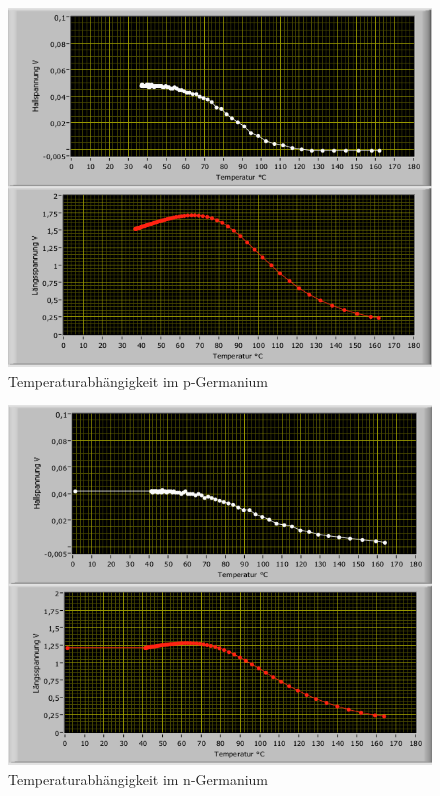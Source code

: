 \documentclass[12pt,a4paper]{article}
\begin{document}
\begin{figure}[H]
	\centering
	\includegraphics[scale=0.7]{./figures/Hall_pGe_temp.png}
	\caption{Temperaturabhängigkeit im p-Germanium}
	\label{fig:pGe_mag_temp}
\end{figure}
\begin{figure}[H]
	\centering
	\includegraphics[scale=0.7]{./figures/Hall_nGe_temp.png}
	\caption{Temperaturabhängigkeit im n-Germanium}
	\label{fig:nGe_mag_temp}
\end{figure}
\end{document}
